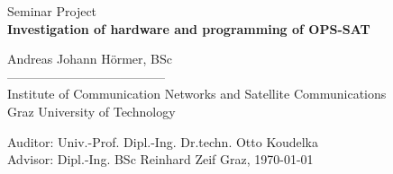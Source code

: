 \begin{titlepage}
\begin{center}
  \vspace*{0.5cm}
  {\LARGE Seminar Project} \\
  \vspace{15mm}
  {\huge \bf Investigation of hardware and programming of OPS-SAT \\}

  \vspace{15mm}
  {\LARGE Andreas Johann H\"ormer, BSc} \\
  \vspace{10mm}%
  -------------------------------------- \\
  \vspace{10mm}%
  \large
   Institute of Communication Networks and Satellite Communications \\
  Graz University of Technology \\


  \vspace{15mm}%
\begin{figure}[!ht]
\begin{center}
    \hspace{20mm}
\end{center}
\end{figure}
  \vspace{10mm}
  Auditor: Univ.-Prof. Dipl.-Ing. Dr.techn. Otto Koudelka  \\
  Advisor: Dipl.-Ing. BSc Reinhard Zeif 
  \vfill
  Graz, \today
  \vspace{0.5cm}
\end{center}
\end{titlepage}


